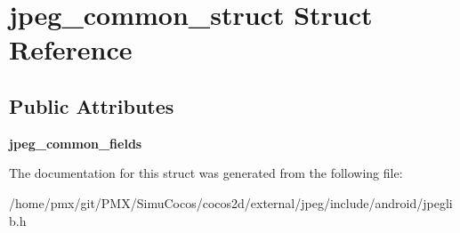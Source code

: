 \hypertarget{structjpeg__common__struct}{}\section{jpeg\+\_\+common\+\_\+struct Struct Reference}
\label{structjpeg__common__struct}
\subsection*{Public Attributes}
\begin{DoxyCompactItemize}
\item 
\mbox{\label{structjpeg__common__struct_af0328603f836658f65d39679f6bbfa7a}} 
{\bfseries jpeg\+\_\+common\+\_\+fields}
\end{DoxyCompactItemize}


The documentation for this struct was generated from the following file\+:\begin{DoxyCompactItemize}
\item 
/home/pmx/git/\+P\+M\+X/\+Simu\+Cocos/cocos2d/external/jpeg/include/android/jpeglib.\+h\end{DoxyCompactItemize}
